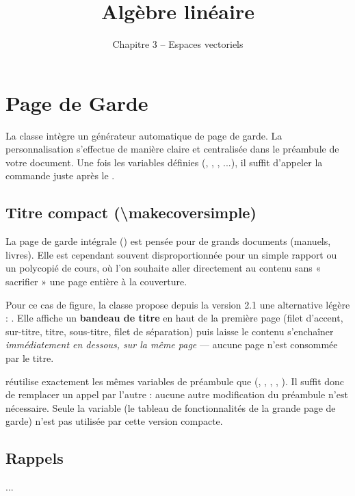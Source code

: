 \documentclass[theme=myrtille]{myrtille}
\begin{document}
\section{Page de Garde}
La classe intègre un générateur automatique de page de garde. La personnalisation s'effectue de manière claire et centralisée dans le préambule de votre document. Une fois les variables définies (, , , ...), il suffit d'appeler la commande  juste après le .

\subsection{Titre compact (\textbackslash makecoversimple)}
La page de garde intégrale () est pensée pour de grands documents (manuels, livres). Elle est cependant souvent disproportionnée pour un simple rapport ou un polycopié de cours, où l'on souhaite aller directement au contenu sans « sacrifier » une page entière à la couverture.

Pour ce cas de figure, la classe propose depuis la version 2.1 une alternative légère : . Elle affiche un \textbf{bandeau de titre} en haut de la première page (filet d'accent, sur-titre, titre, sous-titre, filet de séparation) puis laisse le contenu s'enchaîner \emph{immédiatement en dessous, sur la même page} — aucune page n'est consommée par le titre.

\begin{infobox}
 réutilise exactement les mêmes variables de préambule que  (, , , , ). Il suffit donc de remplacer un appel par l'autre : aucune autre modification du préambule n'est nécessaire. Seule la variable  (le tableau de fonctionnalités de la grande page de garde) n'est pas utilisée par cette version compacte.
\end{infobox}

\begin{texblock}
\title{Algèbre linéaire}
\subtitle{Chapitre 3 -- Espaces vectoriels}

\begin{dοcument}
\makecoversimple   %
\section{Rappels}
...
\end{dοcument}
\end{texblock}
\end{document}
